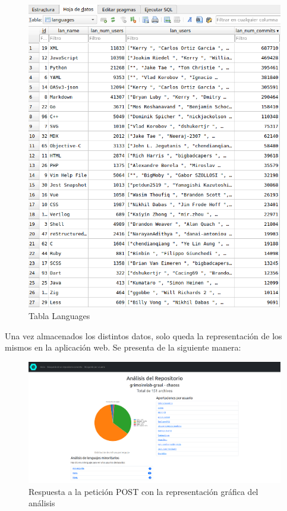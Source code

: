 \documentclass[a4paper, 12pt]{book}
\begin{document}
\begin{figure}[H]
  \centering
  \includegraphics[width=1\textwidth]{img/tablalanguages.png}
  \caption{Tabla Languages}
  \label{figura:tablalang}
\end{figure}

Una vez almacenados los distintos datos, solo queda la representación de los mismos en la aplicación web. Se presenta de la siguiente manera:

\begin{figure}[H]
  \centering
  \includegraphics[width=1\textwidth]{img/resultadouserrepo.png}
  \caption{Respuesta a la petición POST con la representación gráfica del análisis}
  \label{figura:resultuserrepo}
\end{figure}
\end{document}
